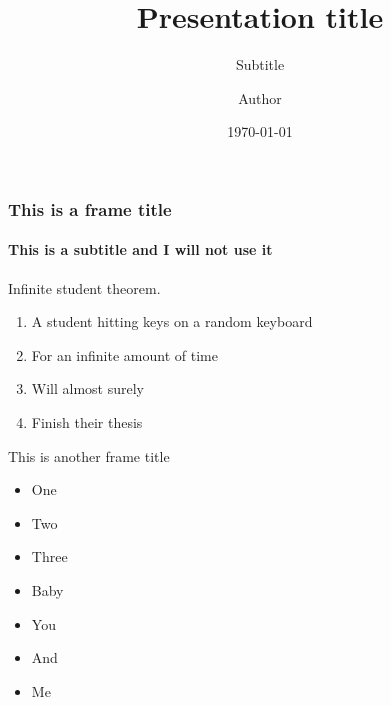 \documentclass{beamer}
\title{Presentation title}
\subtitle{Subtitle}
\institute{The Institute}
\date[Date]{\today}
\author[Author]{Author}
\begin{document}
  \begin{frame}
    \titlepage
  \end{frame}
  \begin{frame}
    \frametitle{This is a frame title}
    \framesubtitle{This is a subtitle and I will not use it}
    \begin{theorem}
      Infinite student theorem.
    \end{theorem}
    \begin{enumerate}
      \item<1-> A student hitting keys on a random keyboard
      \item<2-> For an infinite amount of time
      \item<3-> Will almost surely
      \item<4> Finish their thesis
    \end{enumerate}
  \end{frame}
  \begin{frame}{This is another frame title}
    \begin{itemize}
      \item One
      \item Two
      \item Three
      \item \alert{Baby}
      \item You
      \item And
      \item Me
    \end{itemize}
  \end{frame}
\end{document}
